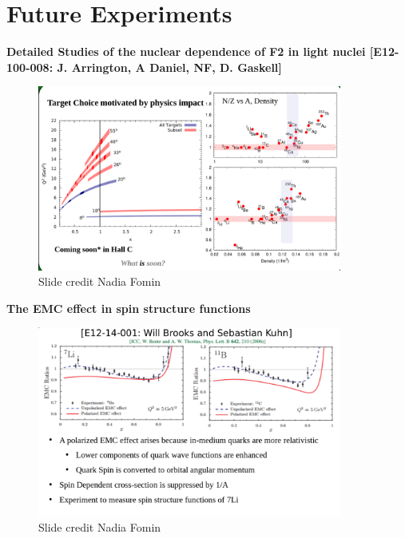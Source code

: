 \documentclass[12pt]{beamer}
\begin{document}
\section{Future Experiments}
\begin{frame}{}

\small{\textbf{Detailed Studies of the nuclear dependence of F2 in light nuclei 
	[E12-100-008: J. Arrington, A Daniel, NF, D. Gaskell]}}
\begin{figure}
	\includegraphics[width=10cm]{../images/moreEMC.png}
	\caption*{Slide credit Nadia Fomin}
\end{figure}
\end{frame}
\begin{frame}{}

\centering \textbf{The EMC effect in spin structure functions}
\begin{figure}
	\includegraphics[width=10cm]{../images/moreEMC1.png}
	\caption*{Slide credit Nadia Fomin}
\end{figure}

\end{frame}
\end{document}
